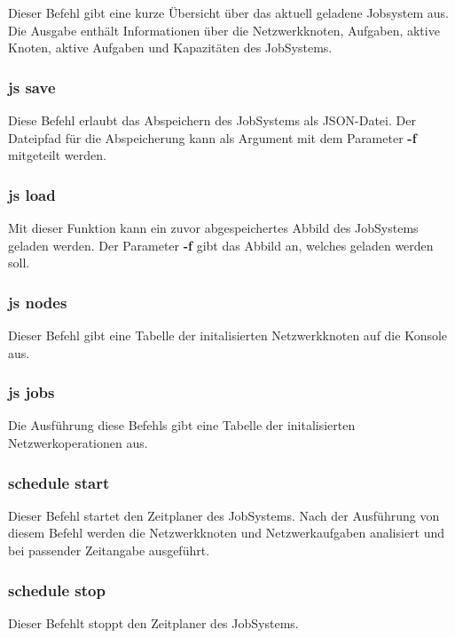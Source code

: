 \documentclass[12pt,a4paper]{report}
\begin{document}
\begin{onehalfspace}
Dieser Befehl gibt eine kurze Übersicht über das aktuell geladene Jobsystem aus. Die Ausgabe enthält Informationen über die Netzwerkknoten, Aufgaben, aktive Knoten, aktive Aufgaben und Kapazitäten des JobSystems.

\subsubsection{js save}

Diese Befehl erlaubt das Abspeichern des JobSystems als JSON-Datei. Der Dateipfad für die Abspeicherung kann als Argument mit dem Parameter \textbf{-f} mitgeteilt werden.

\subsubsection{js load}

Mit dieser Funktion kann ein zuvor abgespeichertes Abbild des JobSystems geladen werden. Der Parameter \textbf{-f} gibt das Abbild an, welches geladen werden soll.

\subsubsection{js nodes}

Dieser Befehl gibt eine Tabelle der initalisierten Netzwerkknoten auf die Konsole aus.

\subsubsection{js jobs}

Die Ausführung diese Befehls gibt eine Tabelle der initalisierten Netzwerkoperationen aus.

\subsubsection{schedule start}

Dieser Befehl startet den Zeitplaner des JobSystems. Nach der Ausführung von diesem Befehl werden die Netzwerkknoten und Netzwerkaufgaben analisiert und bei passender Zeitangabe ausgeführt.

\subsubsection{schedule stop}

Dieser Befehlt stoppt den Zeitplaner des JobSystems.


\end{onehalfspace}
\end{document}
